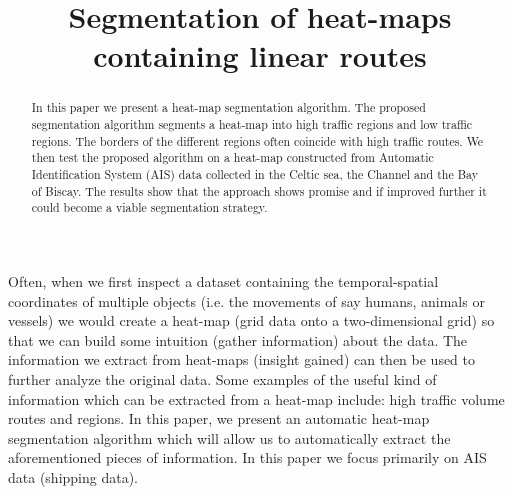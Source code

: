 \documentclass{article}
\title{Segmentation of heat-maps containing linear routes}
\author{\vspace{-10ex}}
\date{\vspace{-5ex}}
\begin{document}
\maketitle
\begin{abstract}
In this paper we present a heat-map segmentation algorithm. The proposed segmentation algorithm
segments a heat-map into high traffic regions and low traffic regions. The borders of the different regions often coincide with high traffic routes. We then test the proposed 
algorithm on a heat-map constructed from Automatic Identification System (AIS) data collected in the Celtic sea, the Channel and the Bay of Biscay. The results show that the approach shows promise and if improved further 
it could become a viable segmentation strategy.
\end{abstract}
Often, when we first inspect a dataset containing the temporal-spatial coordinates of multiple objects (i.e. the movements of say humans, animals or vessels)
we would create a heat-map (grid data onto a two-dimensional grid) so that we can build some intuition (gather information) about the data.
The information we extract from heat-maps (insight gained) can then be used to further analyze the original data. Some examples of the useful kind of information which can be extracted from a 
heat-map include: high traffic volume routes and regions. In this paper, we present an automatic heat-map segmentation algorithm which will allow us to automatically extract the 
 aforementioned pieces of information. In this paper we focus primarily on AIS data (shipping data). 
 
\end{document}
